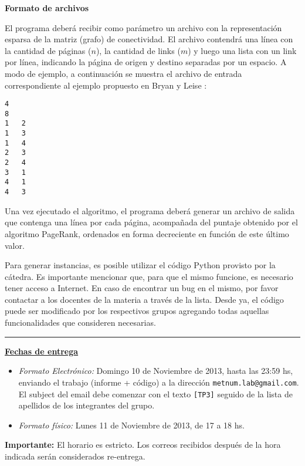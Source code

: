 \textbf{Formato de archivos}

El programa deber\'a recibir como par\'ametro un archivo con la representaci\'on esparsa de la matriz (grafo) de
conectividad. El archivo contendr\'a una l\'inea con la cantidad de p\'aginas ($n$), la cantidad de links ($m$) y luego
una lista con un link por l\'inea, indicando la p\'agina de origen y destino separadas por un espacio. A modo de
ejemplo, a continuaci\'on se muestra el archivo de entrada correspondiente al ejemplo propuesto en Bryan y Leise
\cite[Figura 1]{Bryan2006}: 

\begin{verbatim}
4 
8 
1   2
1   3
1   4
2   3
2   4
3   1
4   1
4   3
\end{verbatim}

Una vez ejecutado el algoritmo, el programa deber\'a generar un archivo de salida que contenga una l\'inea por cada
p\'agina, acompa\~nada del puntaje obtenido por el algoritmo PageRank, ordenados en forma decreciente en funci\'on de
este \'ultimo valor.

Para generar instancias, es posible utilizar el c\'odigo Python provisto por la c\'atedra. Es importante mencionar que, para que el mismo funcione, es
necesario tener acceso a Internet. En caso de encontrar un bug en el mismo, por favor contactar a los docentes de la
materia a trav\'es de la lista. Desde ya, el c\'odigo puede ser modificado por los respectivos grupos agregando todas
aquellas funcionalidades que consideren necesarias.

\vskip 15pt

\hrule

\vskip 11pt


{\bf \underline{Fechas de entrega}}
\begin{itemize}
 \item \emph{Formato Electr\'onico:} Domingo 10 de Noviembre de 2013, hasta las 23:59 hs, enviando el trabajo (informe +
 c\'odigo) a la direcci\'on \verb+metnum.lab@gmail.com+. El subject del email debe comenzar con el texto \verb+[TP3]+
 seguido de la lista de apellidos  de los integrantes del grupo.
 \item \emph{Formato f\'isico:} Lunes 11 de Noviembre de 2013, de 17 a 18 hs.
\end{itemize}

\noindent \textbf{Importante:} El horario es estricto. Los correos recibidos despu\'es de la hora indicada ser\'an considerados re-entrega.  
